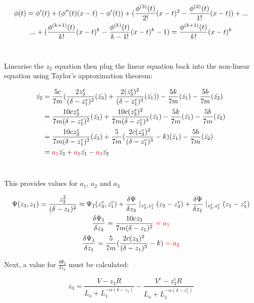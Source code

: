 \documentclass[a4paper,10pt,reqno]{amsart}
\numberwithin{equation}{section}
\begin{document}
\begin{gather}
    \phi(t)=\phi'(t)+(\phi''(t)(x-t)-\phi'(t))+(\frac{\phi^{(3)}(t)}{2!}(x-t)^2-\frac{\phi^{(2)}(t)}{1!}(x-t))+...
    \notag\\
    ...+(\frac{\phi^{(k+1)}(t)}{k!}(x-t)^k - \frac{\phi^{(k)}(t)}{k-1!}(x-t)^k-1) = \frac{\phi^{(k+1)}(t)}{k!}(x-t)^k
\end{gather}
\\
\par Linearise the $\dot{z_2}$ equation then plug the linear equation back into the non-linear equation using Taylor's approximation theorem:


\begin{align}
    \dot{z_2}&=\frac{5c}{7m}(\frac{2z_3^e}{(\delta-z_1^e)^2}(\bar{z_3})+\frac{2(z_3^e)^2}{(\delta-z_1^e)^3}(\bar{z_1}))-\frac{5k}{7m}(\bar{z_1})-\frac{5b}{7m}(\bar{z_2})
    \\
    &=\frac{10cz_3^e}{7m(\delta-z_1^e)^2}(\bar{z_3})+\frac{10c(z_3^e)^2}{7m(\delta-z_1^e)^3}(\bar{z_1})-\frac{5k}{7m}(\bar{z_1})-\frac{5b}{7m}(\bar{z_2})
    \\
    &=\frac{10cz_3^e}{7m(\delta-z_1^e)^2}(\bar{z_3})+\frac{5}{7m}(\frac{2c(z_3^e)^2}{(\delta-z_1^e)^3}-k)(\bar{z_1})-\frac{5b}{7m}(\bar{z_2})
    \\
    &=\color{red}a_1\color{black}\bar{z_3} + \color{red}a_2\color{black}\bar{z_1} - \color{red}a_3\color{black}\bar{z_2}
\end{align}
\\
\par This provides values for \color{red}$a_1$\color{black}, \color{red}$a_2$ \color{black}and \color{red}$a_3$\color{black}

\begin{gather}
    \Psi(z_3,z_1)=\frac{z_3^2}{(\delta-z_1)^2}\approx\Psi_1(z_3^e,z_1^e)+\frac{\delta\Psi}{\delta z_3}\mid_{z_3^e,z_1^e}(z_3-z_3^e)+\frac{\delta\Psi}{\delta z_1}\mid_{z_3^e,z_1^e}(z_1-z_1^e)
    \notag\\
    \frac{\delta\Psi_1}{\delta z_3}=\frac{10cz_3}{7m(\delta-z_1)^2}\color{red}=a_1\color{black}
    \notag\\
    \frac{\delta\Psi_1}{\delta z_1}=\frac{5}{7m}(\frac{2c(z_3)^2}{(\delta-z_1)^3}-k)\color{red}=a_2\color{black}
\end{gather}

\par Next, a value for $\frac{\delta\Psi_2}{\delta z_3}$ must be calculated:

\begin{equation}
    \dot{z_3}=\frac{V-z_3R}{L_o+L_1^{-\alpha(\delta-z_1)}}-\frac{V^e-z_3^eR}{L_o+L_1^{-\alpha(\delta-z_1^e)}}
\end{equation}
\end{document}
